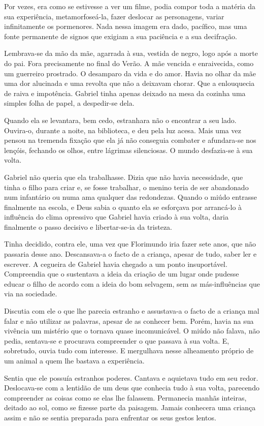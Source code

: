 Por vezes, era como se estivesse a ver um filme, podia compor toda a
matéria da sua experiência, metamorfoseá-la, fazer deslocar as
personagens, variar infinitamente os pormenores. Nada nessa imagem era
dado, pacífico, mas uma fonte permanente de signos que exigiam a sua
paciência e a sua decifração.

Lembrava-se da mão da mãe, agarrada à sua, vestida de negro, logo após a
morte do pai. Fora precisamente no final do Verão. A mãe vencida e
enraivecida, como um guerreiro prostrado. O desamparo da vida e do amor.
Havia no olhar da mãe uma dor alucinada e uma revolta que não a deixavam
chorar. Que a enlouquecia de raiva e impotência. Gabriel tinha apenas
deixado na mesa da cozinha uma simples folha de papel, a despedir-se
dela.

Quando ela se levantara, bem cedo, estranhara não o encontrar a seu
lado. Ouvira-o, durante a noite, na biblioteca, e deu pela luz acesa.
Mais uma vez pensou na tremenda fixação que ela já não conseguia
combater e afundara-se nos lençóis, fechando os olhos, entre lágrimas
silenciosas. O mundo desfazia-se à sua volta.

Gabriel não queria que ela trabalhasse. Dizia que não havia necessidade,
que tinha o filho para criar e, se fosse trabalhar, o menino teria de
ser abandonado num infantário ou numa ama qualquer das redondezas.
Quando o miúdo entrasse finalmente na escola, e Deus sabia o quanto ela
se esforçava por arrancá-lo à influência do clima opressivo que Gabriel
havia criado à sua volta, daria finalmente o passo decisivo e
libertar-se-ia da tristeza.

Tinha decidido, contra ele, uma vez que Florimundo iria fazer sete anos,
que não passaria desse ano. Descansava-a o facto de a criança, apesar de
tudo, saber ler e escrever. A cegueira de Gabriel havia chegado a um
ponto insuportável. Compreendia que o sustentava a ideia da criação de
um lugar onde pudesse educar o filho de acordo com a ideia do bom
selvagem, sem as más-influências que via na sociedade.

Discutia com ele o que lhe parecia estranho e assustava-a o facto de a
criança mal falar e não utilizar as palavras, apesar de as conhecer bem.
Porém, havia na sua vivência um mistério que o tornava quase
incomunicável. O miúdo não falava, não pedia, sentava-se e procurava
compreender o que passava à sua volta. E, sobretudo, ouvia tudo com
interesse. E mergulhava nesse alheamento próprio de um animal a quem lhe
bastava a experiência.

Sentia que ele possuía estranhos poderes. Cantava e aquietava tudo em
seu redor. Deslocava-se com a lentidão de um deus que conhecia tudo à
sua volta, parecendo compreender as coisas como se elas lhe falassem.
Permanecia manhãs inteiras, deitado ao sol, como se fizesse parte da
paisagem. Jamais conhecera uma criança assim e não se sentia preparada
para enfrentar os seus gestos lentos.

